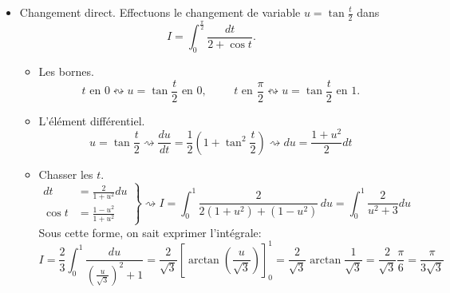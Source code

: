 \begin{itemize}
\item Changement direct. Effectuons le changement de variable $u=\tan \frac{t}{2}$ dans
\begin{displaymath}
I=\int_0^{\frac{\pi}{2}}\frac{dt}{2+\cos t} .
\end{displaymath}
\begin{itemize}
  \item Les bornes.
\begin{displaymath}
  t \text{ en } 0\leftrightsquigarrow u=\tan \frac{t}{2} \text{ en } 0,\hspace{1cm}
  t \text{ en } \frac{\pi}{2}\leftrightsquigarrow u=\tan \frac{t}{2} \text{ en } 1 .
\end{displaymath}
  \item L'élément différentiel.
\begin{displaymath}
  u = \tan \frac{t}{2} \rightsquigarrow \frac{du}{dt} = \frac{1}{2}(1+\tan^2\frac{t}{2})\rightsquigarrow du =\frac{1+u^2}{2}dt
\end{displaymath}
  \item Chasser les $t$.
\begin{displaymath}
\left. 
\begin{aligned}
  dt     &= \frac{2}{1+u^2}du \\
  \cos t &= \frac{1-u^2}{1+u^2}
\end{aligned}
\right\rbrace 
\rightsquigarrow
I = \int_{0}^{1}\frac{2}{2(1+u^2)+(1-u^2)}\,du = \int_{0}^{1}\frac{2}{u^2 + 3}du
\end{displaymath}
Sous cette forme, on sait exprimer l'intégrale:
\begin{displaymath}
  I = \frac{2}{3}\int_{0}^{1}\frac{du}{(\frac{u}{\sqrt{3}})^2+1} = \frac{2}{\sqrt{3}} \left[\arctan (\frac{u}{\sqrt{3}}) \right]_{0}^{1} 
  = \frac{2}{\sqrt{3}} \arctan\frac{1}{\sqrt{3}} = \frac{2}{\sqrt{3}}\frac{\pi}{6}=\frac{\pi}{3\sqrt{3}}
\end{displaymath}
\end{itemize}


\end{itemize}
